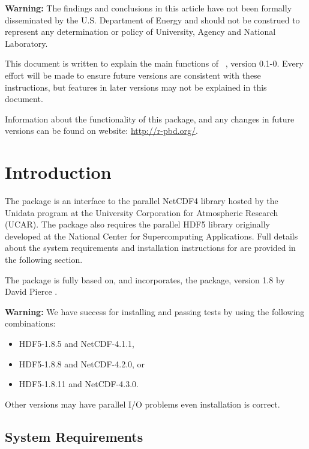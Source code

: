 {\color{red} \bf Warning:}
The findings and conclusions in this article have not been
formally disseminated by the U.S. Department of Energy
and should not be construed to represent any determination or
policy of University, Agency and National Laboratory.

This document is written to explain the main
functions of ~\citep{Ostrouchov2012pbdNCDF4package},
version 0.1-0.
Every effort will be made to ensure future versions are consistent with
these instructions, but features in later versions may not be explained
in this document.

Information about the functionality of this package,
and any changes in future versions can be found on website:
\url{http://r-pbd.org/}.




\section{Introduction}
\label{sec:quick_start}

The  package is an interface to the parallel NetCDF4 library \citep{netcdf} hosted by the Unidata program at the University Corporation for Atmospheric Research (UCAR). The package also requires the parallel HDF5 library \citep{hdf5} originally developed at the National Center for Supercomputing Applications. Full details about the system requirements and installation instructions for  are provided in the following section.

The  package is fully based on, and incorporates, the  package, version 1.8 by David Pierce \citep{ncdf4}.  

{\color{red} \bf Warning:}
We have success for installing and passing tests by using the following
combinations:
\begin{itemize}
\item HDF5-1.8.5 and NetCDF-4.1.1,
\item HDF5-1.8.8 and NetCDF-4.2.0, or
\item HDF5-1.8.11 and NetCDF-4.3.0.
\end{itemize}
Other versions may have parallel I/O problems even installation is correct.


\subsection[System Requirements]{System Requirements}
\label{sec:system_requirements}

